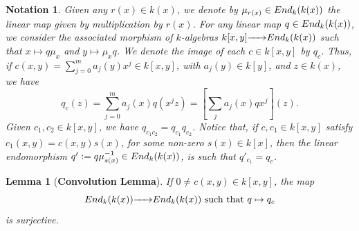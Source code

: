 \documentclass[10pt,a4paper]{amsart}
\newtheorem{lemma}{Lemma}
\newtheorem{notation}{Notation}
\newcommand{\End}{{ \rm End }}
\newcommand{\rightmap}[1]{\smash{\mathop{\hbox to 
20pt{\rightarrowfill}}\limits^{#1}}}
\begin{document}
\begin{notation}\label{N: def de qsubc} Given any $r(x)\in k(x)$, we denote by $\mu_{r(x)}\in \End_k(k(x))$ the linear map given by multiplication by $r(x)$. 
For any linear map $q\in \End_k(k(x))$, we consider the associated morphism of $k$-algebras $k[x,y]\rightmap{}\End_k(k(x))$ such that $x\mapsto q\mu_x$ and $y\mapsto \mu_xq$. 
We denote the image of each $c\in k[x,y]$ by $q_c$. Thus, if $c(x,y)=\sum_{j=0}^ma_j(y)x^j\in k[x,y]$, with $a_j(y)\in k[y]$, and $z\in k(x)$, we have 
$$q_c(z)=\sum_{j=0}^ma_j(x)q(x^jz)=\left[\sum_ja_j(x)qx^j\right](z).$$
Given $c_1,c_2\in k[x,y]$, we have 
$q_{c_1c_2}=q_{c_1}q_{c_2}$. 
 Notice that, if $c,c_1\in k[x,y]$ satisfy $c_1(x,y)=c(x,y)s(x)$, for some non-zero $s(x)\in k[x]$, then the linear endomorphism  $q':=q\mu_{s(x)}^{-1}\in \End_k(k(x))$, is such that   $q'_{c_1}=q_c$. 
\end{notation}

\begin{lemma}[{\bf Convolution Lemma}]\label{L: convolution map sobre} If $0\not=c(x,y)\in k[x,y]$,  the map 
$$\End_k(k(x))\rightmap{}\End_k(k(x))\hbox{ such that }q\mapsto q_c$$ is surjective. 
\end{lemma}
\end{document}
